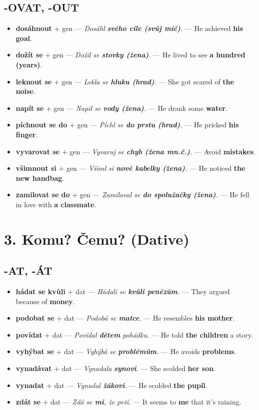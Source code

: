\documentclass[12pt]{book}
\begin{document}
\subsection*{-OVAT, -OUT}
\begin{itemize}
    \item \textbf{dosáhnout} + gen --- \textit{Dosáhl \textbf{svého cíle (svůj míč)}.} --- He achieved \textbf{his goal}.
    \item \textbf{dožít se} + gen --- \textit{Dožil se \textbf{stovky (žena)}.} --- He lived to see \textbf{a hundred (years)}.
    \item \textbf{leknout se} + gen --- \textit{Lekla se \textbf{hluku (hrad)}.} --- She got scared of \textbf{the noise}.
    \item \textbf{napít se} + gen --- \textit{Napil se \textbf{vody (žena)}.} --- He drank some \textbf{water}.
    \item \textbf{píchnout se do} + gen --- \textit{Píchl se \textbf{do prstu (hrad)}.} --- He pricked \textbf{his finger}.
    \item \textbf{vyvarovat se} + gen --- \textit{Vyvaruj se \textbf{chyb (žena mn.č.)}.} --- Avoid \textbf{mistakes}.
    \item \textbf{všimnout si} + gen --- \textit{Všiml si \textbf{nové kabelky (žena)}.} --- He noticed \textbf{the new handbag}.
    \item \textbf{zamilovat se do} + gen --- \textit{Zamiloval se \textbf{do spolužačky (žena)}.} --- He fell in love with \textbf{a classmate}.
\end{itemize}

\section{3. Komu? Čemu? (Dative)}
\subsection*{-AT, -ÁT}
\begin{itemize}
    \item \textbf{hádat se kvůli} + dat --- \textit{Hádali se \textbf{kvůli penězům}.} --- They argued because of \textbf{money}.
    \item \textbf{podobat se} + dat --- \textit{Podobá se \textbf{matce}.} --- He resembles \textbf{his mother}.
    \item \textbf{povídat} + dat --- \textit{Povídal \textbf{dětem} pohádku.} --- He told \textbf{the children} a story.
    \item \textbf{vyhýbat se} + dat --- \textit{Vyhýbá se \textbf{problémům}.} --- He avoids \textbf{problems}.
    \item \textbf{vynadávat} + dat --- \textit{Vynadala \textbf{synovi}.} --- She scolded \textbf{her son}.
    \item \textbf{vynadat} + dat --- \textit{Vynadal \textbf{žákovi}.} --- He scolded \textbf{the pupil}.
    \item \textbf{zdát se} + dat --- \textit{Zdá se \textbf{mi}, že prší.} --- It seems to \textbf{me} that it's raining.
\end{itemize}
\end{document}
